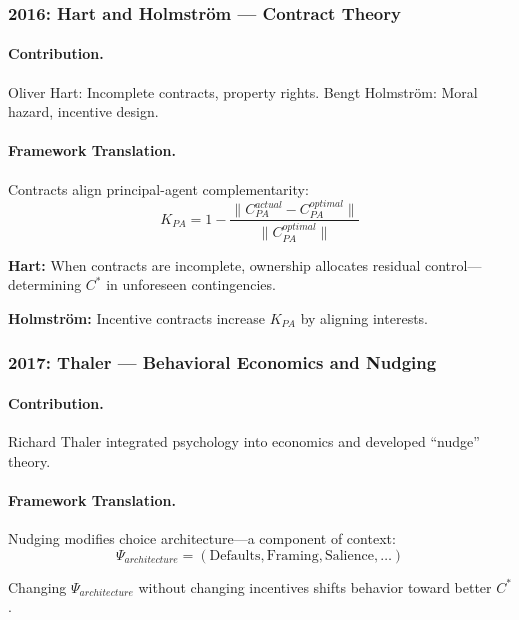 \documentclass[12pt,a4paper]{article}
\begin{document}
\subsubsection{2016: Hart and Holmström --- Contract Theory}

\paragraph{Contribution.}
Oliver Hart: Incomplete contracts, property rights.
Bengt Holmström: Moral hazard, incentive design.

\paragraph{Framework Translation.}
Contracts align principal-agent complementarity:
\begin{equation}
  K_{PA} = 1 - \frac{\|C_{PA}^{actual} - C_{PA}^{optimal}\|}{\|C_{PA}^{optimal}\|}
\end{equation}

\textbf{Hart:} When contracts are incomplete, ownership allocates residual control---
determining $C^*$ in unforeseen contingencies.

\textbf{Holmström:} Incentive contracts increase $K_{PA}$ by aligning interests.

\subsubsection{2017: Thaler --- Behavioral Economics and Nudging}

\paragraph{Contribution.}
Richard Thaler \citep{thalersunstein2008} integrated psychology into economics and developed ``nudge'' theory.

\paragraph{Framework Translation.}
Nudging modifies choice architecture---a component of context:
\begin{equation}
  \Psi_{architecture} = (\text{Defaults}, \text{Framing}, \text{Salience}, \ldots)
\end{equation}

Changing $\Psi_{architecture}$ without changing incentives shifts behavior toward better $C^*$.
\end{document}
